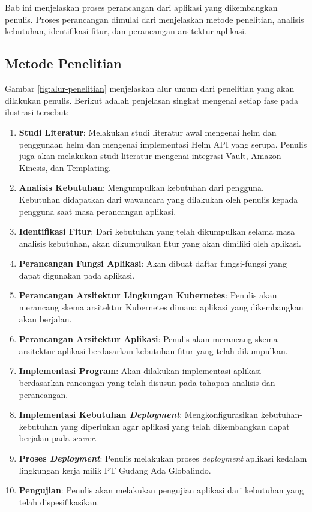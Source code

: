 \chapter{\babTiga}
\label{bab:3}
Bab ini menjelaskan proses perancangan dari aplikasi yang dikembangkan penulis. Proses perancangan dimulai dari menjelaskan metode penelitian, analisis kebutuhan, identifikasi fitur, dan perancangan arsitektur aplikasi.


\section{Metode Penelitian}
\label{sec:metodePenelitian}

Gambar \ref{fig:alur-penelitian} menjelaskan alur umum dari penelitian yang akan dilakukan penulis. Berikut adalah penjelasan singkat mengenai setiap fase pada ilustrasi tersebut:

\begin{enumerate}
    \item \textbf{Studi Literatur}: Melakukan studi literatur awal mengenai helm dan penggunaan helm dan mengenai implementasi Helm API yang serupa. Penulis juga akan melakukan studi literatur mengenai integrasi Vault, Amazon Kinesis, dan Templating.
    \item \textbf{Analisis Kebutuhan}: Mengumpulkan kebutuhan dari pengguna. Kebutuhan didapatkan dari wawancara yang dilakukan oleh penulis kepada pengguna saat masa perancangan aplikasi.
    \item \textbf{Identifikasi Fitur}: Dari kebutuhan yang telah dikumpulkan selama masa analisis kebutuhan, akan dikumpulkan fitur yang akan dimiliki oleh aplikasi.
    \item \textbf{Perancangan Fungsi Aplikasi}: Akan dibuat daftar fungsi-fungsi yang dapat digunakan pada aplikasi.
    \item \textbf{Perancangan Arsitektur Lingkungan Kubernetes}: Penulis akan merancang skema arsitektur Kubernetes dimana aplikasi yang dikembangkan akan berjalan.
    \item \textbf{Perancangan Arsitektur Aplikasi}: Penulis akan merancang skema arsitektur aplikasi berdasarkan kebutuhan fitur yang telah dikumpulkan.
    \item \textbf{Implementasi Program}: Akan dilakukan implementasi aplikasi berdasarkan rancangan yang telah disusun pada tahapan analisis dan perancangan.
    \item \textbf{Implementasi Kebutuhan \textit{Deployment}}: Mengkonfigurasikan kebutuhan-kebutuhan yang diperlukan agar aplikasi yang telah dikembangkan dapat berjalan pada \textit{server}.
    \item \textbf{Proses \textit{Deployment}}: Penulis melakukan proses \textit{deployment} aplikasi kedalam lingkungan kerja milik PT Gudang Ada Globalindo.
    \item \textbf{Pengujian}: Penulis akan melakukan pengujian aplikasi dari kebutuhan yang telah dispesifikasikan.
\end{enumerate}

